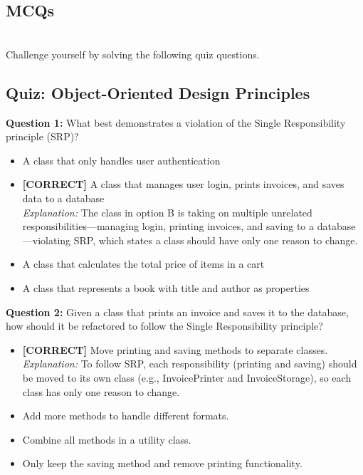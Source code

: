 

\subsection{MCQs}\label{MCQs}
\\
Challenge yourself by solving the following quiz questions.

\subsection*{Quiz: Object-Oriented Design Principles}
\vspace{0.3cm}
\noindent
\textbf{Question 1:} What best demonstrates a violation of the Single Responsibility principle (SRP)?
\\[0.2cm]
\begin{itemize}
 \item A class that only handles user authentication
 \item \textbf{[CORRECT]} A class that manages user login, prints invoices, and saves data to a database
\\[0.1cm]
\textit{Explanation:} 
The class in option B is taking on multiple unrelated responsibilities---managing login, printing invoices, and saving to a database---violating SRP, which states a class should have only one reason to change.
 \item A class that calculates the total price of items in a cart
 \item A class that represents a book with title and author as properties
\end{itemize}
\vspace{0.3cm}
\noindent
\textbf{Question 2:} Given a class that prints an invoice and saves it to the database, how should it be refactored to follow the Single Responsibility principle?
\\[0.2cm]
\begin{itemize}
 \item \textbf{[CORRECT]} Move printing and saving methods to separate classes.
\\[0.1cm]
\textit{Explanation:} 
To follow SRP, each responsibility (printing and saving) should be moved to its own class (e.g., InvoicePrinter and InvoiceStorage), so each class has only one reason to change.
 \item Add more methods to handle different formats.
 \item Combine all methods in a utility class.
 \item Only keep the saving method and remove printing functionality.
\end{itemize}
